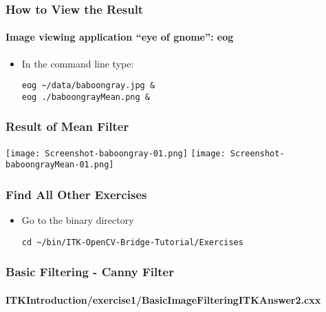 \begin{frame}[fragile]
\frametitle{How to View the Result}
\framesubtitle{Image viewing application ``eye of gnome'': eog}
\begin{itemize}
\item In the command line type:
\begin{verbatim}
eog ~/data/baboongray.jpg &
eog ./baboongrayMean.png &
\end{verbatim}
\end{itemize}
\end{frame}

\begin{frame}[fragile]
\frametitle{Result of Mean Filter}
\begin{center}
  \texttt{[image: Screenshot-baboongray-01.png]}
  \texttt{[image: Screenshot-baboongrayMean-01.png]}
\end{center}
\end{frame}

\begin{frame}[fragile]
\frametitle{Find All Other Exercises}
\begin{itemize}
\item Go to the binary directory
\begin{verbatim}
cd ~/bin/ITK-OpenCV-Bridge-Tutorial/Exercises
\end{verbatim}
\end{itemize}
\end{frame}

\begin{frame}
\frametitle{Basic Filtering - Canny Filter}
\framesubtitle{ITKIntroduction/exercise1/BasicImageFilteringITKAnswer2.cxx}
\end{frame}

